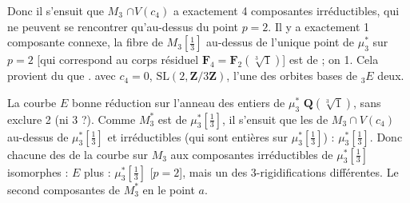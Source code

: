 \documentclass[11pt,a4paper]{article}
\begin{document}
Donc il s'ensuit que $M_3$ \struck{\ill{}} $\cap V(c_4)$ a exactement 4
composantes irréductibles, \struck{\ill{}} qui ne peuvent se rencontrer
qu'au-dessus du point $p=2$. Il y a exactement 1 composante connexe, 
la fibre de $M_3[\tfrac13]$ au-dessus de l'unique point de $\mu_3^{*}$ sur
$p=2$ [qui correspond au \struck{\ill{}} corps résiduel $\mathbf{F}_4 =
\mathbf{F}_2(\sqrt[3]{1})$] est de  \ill{} ; on
\ill{} \ill{} 1. Cela provient du  que \add{(\ill{})} \ill{}
\ill{} \ill{} \ill{}. \ill{} \ill{} \ill{} \ill{} avec $c_4=0$, \ill{}
$\mathrm{SL}(2,\mathbf{Z}/3\mathbf{Z})$, \ill{} \ill{} \ill{} l'une des
orbites \ill{} \ill{}  \ill{} bases de ${}_3E$ \ill{} deux.

\struck{\ill{}} La courbe $E$ \struck{\ill{}}  bonne réduction sur
l'anneau des \struck{\ill{}} entiers \ill{} de $\mu_3^{*}$ \ill{}
$\mathbf{Q}(\sqrt[3]{1})$,  sans exclure 2 (ni 3 ?). Comme
\struck{\ill{}} $M_3^{*}$ \struck{\ill{}} est  \ill{}
de $\mu_3^{*}[\tfrac13]$, il s'ensuit que les \ill{} de $M_3 \cap V(c_4)$
\ill{} au-dessus de $\mu_3^{*}[\tfrac13]$ et \ill{} irréductibles (qui sont
entières sur $\mu_3^{*}[\tfrac13]$) \ill{} \ill{} \emph{}
 : $\mu_3^{*}[\tfrac13]$. Donc chacune des
\ill{} de la courbe  \struck{\ill{}} sur $M_3$ aux
composantes irréductibles de $\mu_3^{*}[\tfrac13]$ \ill{} isomorphes : $E$
\ill{} plus \ill{} \ill{}  :
$\mu_3^{*}[\tfrac13]$ \ill{} [$p=2$], mais un des \ill{} \ill{} \ill{}
3-rigidifications différentes. Le second \ill{} \ill{} \ill{} \ill{}
composantes \ill{} \ill{} \ill{} de $M_3^{*}$ en le point $a$.

\end{document}
